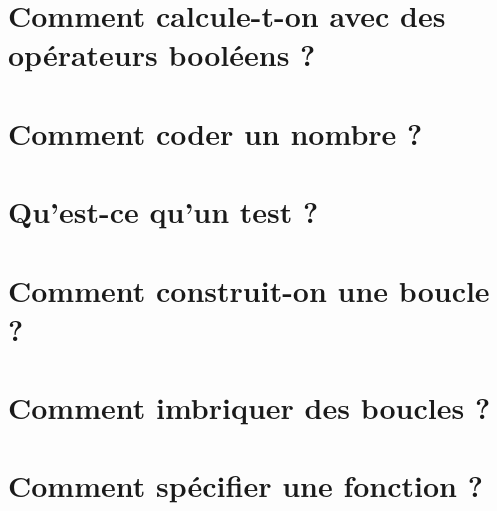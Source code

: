 \documentclass[11pt,a4paper,colorlinks,breaklinks]{article}
\begin{document}
\section{Comment calcule-t-on avec des opérateurs booléens ?}\label{sec:booleens}
	

\newpage
\section{Comment coder un nombre ?}\label{sec:codage}
	

\newpage
\section{Qu'est-ce qu'un test ?}\label{sec:tests}
	

\newpage
\section{Comment construit-on une boucle ?}\label{sec:boucles}
	

\newpage
\section{Comment imbriquer des boucles ?}\label{sec:boucles-imbriquees}
	

\newpage
\section{Comment spécifier une fonction ?}\label{sec:specification}
	
\end{document}
